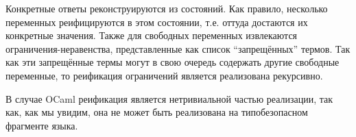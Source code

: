 
Конкретные ответы реконструируются из состояний. Как правило, несколько переменных реифицируются в этом состоянии, т.е. оттуда достаются их конкретные значения.
Также для свободных переменных извлекаются ограничения-неравенства, представленные как список \enquote{запрещённых} термов.
Так как эти запрещённые термы могут в свою очередь содержать другие свободные переменные, то реификация ограничений является реализована рекурсивно.


В случае OCaml реификация является нетривиальной частью реализации, так как, как мы увидим, она не может быть реализована на типобезопасном фрагменте языка.
